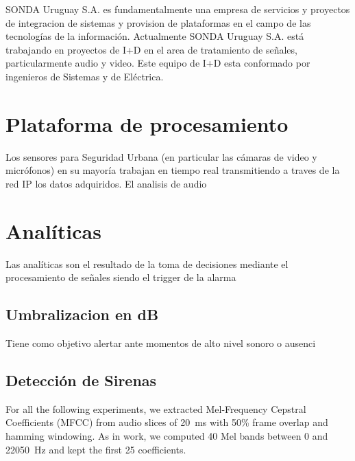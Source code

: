 \documentclass{article}
\begin{document}
SONDA Uruguay S.A. es fundamentalmente una empresa de servicios y proyectos de integracion de sistemas y provision de plataformas en el campo de las tecnologías de la información. Actualmente SONDA Uruguay S.A. está trabajando en proyectos de I+D en el area de tratamiento de señales, particularmente audio y video. Este equipo de I+D esta conformado por ingenieros de Sistemas y de Eléctrica.

 

\section{Plataforma de procesamiento}

Los sensores para Seguridad Urbana (en particular las cámaras de video y micrófonos) en su mayoría trabajan en tiempo real transmitiendo a traves de la red IP los datos adquiridos. El analisis de audio 

\section{Analíticas}

Las analíticas son el resultado de la toma de decisiones mediante el procesamiento de señales siendo el trigger de la alarma

\subsection{Umbralizacion en dB}
Tiene como objetivo alertar ante momentos de alto nivel sonoro o ausenci

\subsection{Detección de Sirenas}
For all the following experiments, we extracted Mel-Frequency Cepstral Coefficients (MFCC) from audio slices of \SI{20}{\milli\second} with 50\% frame overlap and hamming windowing. As in \cite{Salamon:UrbanSound:ACMMM:14} work, we computed 40 Mel bands between 0 and \SI{22050}{\Hz} and kept the first 25 coefficients. 


\end{document}
